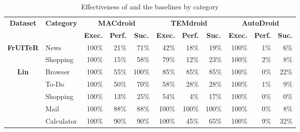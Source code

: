 \begin{table}[htbp]
  \centering
  \caption{Effectiveness of \toolNameSmall{} and the baselines by category}
    \begin{tabular}{c|l|r|r|r|r|r|r|r|r|r}
    \toprule
    \multirow{2}[4]{*}{\textbf{Dataset}} & \multicolumn{1}{c|}{\multirow{2}[4]{*}{\textbf{Category}}} & \multicolumn{3}{c|}{\textbf{MACdroid}} & \multicolumn{3}{c|}{\textbf{TEMdroid}} & \multicolumn{3}{c}{\textbf{AutoDroid}} \\
\cmidrule{3-11}          &       & \multicolumn{1}{c|}{\textbf{Exec.}} & \multicolumn{1}{c|}{\textbf{Perf.}} & \multicolumn{1}{c|}{\textbf{Suc.}} & \multicolumn{1}{c|}{\textbf{Exec.}} & \multicolumn{1}{c|}{\textbf{Perf.}} & \multicolumn{1}{c|}{\textbf{Suc.}} & \multicolumn{1}{c|}{\textbf{Exec.}} & \multicolumn{1}{c|}{\textbf{Perf.}} & \multicolumn{1}{c}{\textbf{Suc.}} \\
    \midrule
    \multirow{2}[2]{*}{\textbf{FrUITeR}} & News  & 100\% & 21\%  & 71\%  & 42\%  & 18\%  & 19\%  & 100\% & 1\%   & 6\% \\
          & Shopping & 100\% & 15\%  & 58\%  & 79\%  & 12\%  & 23\%  & 100\% & 2\%   & 8\% \\
    \midrule
    \multirow{5}[2]{*}{\textbf{Lin}} & Browser & 100\% & 55\%  & 100\% & 85\%  & 85\%  & 85\%  & 100\% & 0\%   & 22\% \\
          & To-Do & 100\% & 50\%  & 70\%  & 58\%  & 28\%  & 28\%  & 100\% & 1\%   & 9\% \\
          & Shopping & 100\% & 13\%  & 25\%  & 54\%  & 4\%   & 17\%  & 100\% & 0\%   & 0\% \\
          & Mail  & 100\% & 88\%  & 88\%  & 100\% & 100\% & 100\% & 100\% & 0\%   & 8\% \\
          & Calculator & 100\% & 90\%  & 90\%  & 100\% & 45\%  & 65\%  & 100\% & 9\%   & 32\% \\
    \bottomrule
    \end{tabular}%
  \label{tab:effectiveness-by-category}%
\end{table}%

